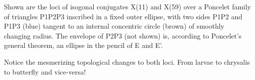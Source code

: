 Shown are the loci of isogonal conjugates X(11) and X(59) over a Poncelet family of triangles P1P2P3 inscribed in a fixed outer ellipse, with two sides P1P2 and P1P3 (blue) tangent to an internal concentric circle (brown) of smoothly changing radius. The envelope of P2P3 (not shown) is, according to Poncelet's general theorem, an ellipse in the pencil of E and E'.

Notice the mesmerizing topological changes to both loci. From larvae to chrysalis to butterfly and vice-versa!